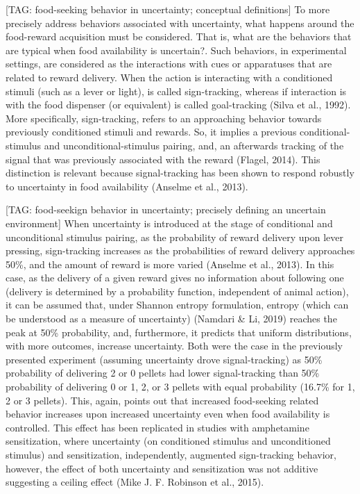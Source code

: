 \documentclass[
]{/home/nicoluarte/Downloads/templates/PNAS-template-main.tex}
\begin{document}
{[}TAG: food-seeking behavior in uncertainty; conceptual definitions{]}
To more precisely address behaviors associated with uncertainty, what
happens around the food-reward acquisition must be considered. That is,
what are the behaviors that are typical when food availability is
uncertain?. Such behaviors, in experimental settings, are considered as
the interactions with cues or apparatuses that are related to reward
delivery. When the action is interacting with a conditioned stimuli
(such as a lever or light), is called sign-tracking, whereas if
interaction is with the food dispenser (or equivalent) is called
goal-tracking (Silva et al., 1992). More specifically, sign-tracking,
refers to an approaching behavior towards previously conditioned stimuli
and rewards. So, it implies a previous conditional-stimulus and
unconditional-stimulus pairing, and, an afterwards tracking of the
signal that was previously associated with the reward (Flagel, 2014).
This distinction is relevant because signal-tracking has been shown to
respond robustly to uncertainty in food availability (Anselme et al.,
2013).

{[}TAG: food-seekign behavior in uncertainty; precisely defining an
uncertain environment{]} When uncertainty is introduced at the stage of
conditional and unconditional stimulus pairing, as the probability of
reward delivery upon lever pressing, sign-tracking increases as the
probabilities of reward delivery approaches 50\%, and the amount of
reward is more varied (Anselme et al., 2013). In this case, as the
delivery of a given reward gives no information about following one
(delivery is determined by a probability function, independent of animal
action), it can be assumed that, under Shannon entropy formulation,
entropy (which can be understood as a measure of uncertainty) (Namdari
\& Li, 2019) reaches the peak at 50\% probability, and, furthermore, it
predicts that uniform distributions, with more outcomes, increase
uncertainty. Both were the case in the previously presented experiment
(assuming uncertainty drove signal-tracking) as 50\% probability of
delivering 2 or 0 pellets had lower signal-tracking than 50\%
probability of delivering 0 or 1, 2, or 3 pellets with equal probability
(16.7\% for 1, 2 or 3 pellets). This, again, points out that increased
food-seeking related behavior increases upon increased uncertainty even
when food availability is controlled. This effect has been replicated in
studies with amphetamine sensitization, where uncertainty (on
conditioned stimulus and unconditioned stimulus) and sensitization,
independently, augmented sign-tracking behavior, however, the effect of
both uncertainty and sensitization was not additive suggesting a ceiling
effect (Mike J. F. Robinson et al., 2015).
\end{document}
